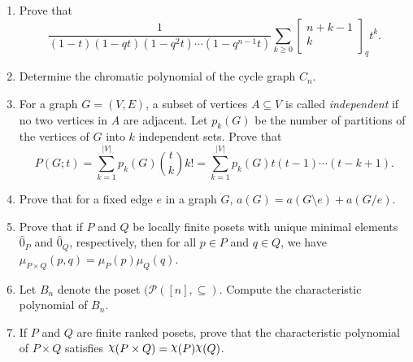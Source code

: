 \documentclass[11pt]{article}
\theoremstyle{definition}
\newcommand{\qbinom}[2]{
  \displaystyle \left[\begin{matrix}#1  \\#2  \\ \end{matrix}\right]}
\DeclareRobustCommand{\rchi}{{\mathpalette\irchi\relax}}
\newcommand{\irchi}[2]{\raisebox{\depth}{$#1\chi$}}
\begin{document}
\begin{enumerate}
\begin{enumerate}
\item Prove that
\[
\frac{1}{(1-t)(1-qt)(1-q^2t)\cdots (1-q^{n-1}t)}\sum_{k\geq 0}\qbinom{n+k-1}{k}_qt^k.
\]

\item Determine the chromatic polynomial of the cycle graph $C_n$.

\item For a graph $G=(V,E)$, a subset of vertices $A\subseteq V$ is called \emph{independent} if no two vertices in $A$ are adjacent. Let $p_k(G)$ be the number of partitions of the vertices of $G$ into $k$ independent sets. Prove that
\[
P(G;t)=\sum_{k=1}^{|V|}p_k(G)\binom{t}{k}k!=\sum_{k=1}^{|V|}p_k(G)t(t-1)\cdots (t-k+1).
\]

\item Prove that for a fixed edge $e$ in a graph $G$, $a(G)=a(G\setminus e)+a(G/e)$.

\item Prove that if $P$ and $Q$ be locally finite posets with unique minimal elements $\hat{0}_P$ and $\hat{0}_Q$, respectively, then for all $p\in P$ and $q\in Q$, we have $\mu_{P\times Q}(p,q)=\mu_P(p)\mu_Q(q)$.

\item Let $B_n$ denote the poset $(\mathcal{P}([n],\subseteq)$.  Compute the characteristic polynomial of $B_n$.

\item If $P$ and $Q$ are finite ranked posets, prove that the characteristic polynomial of $P\times Q$ satisfies $\rchi(P\times Q)=\rchi(P)\rchi(Q)$.

\end{enumerate}

\end{enumerate}
\end{document}
